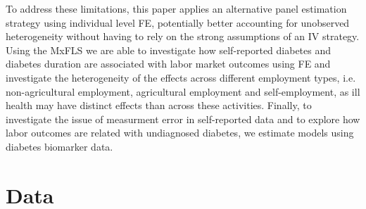 \documentclass[12pt,english,british]{article}
\begin{document}
To address these limitations, this paper applies an alternative panel estimation strategy using individual level \ac{FE}, potentially better accounting for unobserved heterogeneity without having to rely on the strong assumptions of an \ac{IV} strategy. Using the \ac{MxFLS} we are able to investigate
how self-reported diabetes and diabetes duration are associated with
labor market outcomes using \ac{FE} and investigate the heterogeneity
of the effects across different employment types, i.e.
non-agricultural employment, agricultural employment and self-employment, as ill health may have distinct effects than across these activities. Finally, to investigate the issue of measurment error in self-reported data and to explore how labor outcomes are related with undiagnosed diabetes, we estimate models using diabetes biomarker data. 



\section{\label{sec:Data}Data}
\end{document}
